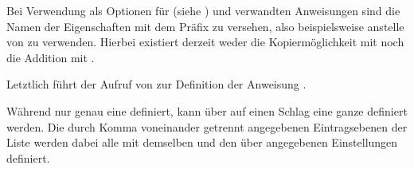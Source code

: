 Bei Verwendung als Optionen
für %
%
 (siehe
) und verwandten
Anweisungen sind die Namen der Eigenschaften mit dem Präfix  zu
versehen, also beispielsweise  anstelle von  zu
verwenden. Hierbei existiert derzeit weder die Kopiermöglichkeit mit
\Option{:=} noch die Addition mit \Option{+=}.

Letztlich führt der Aufruf von  zur Definition der
Anweisung .

Während  nur genau eine 
definiert, kann über
 auf einen
Schlag eine ganze  definiert werden. Die durch
Komma voneinander getrennt angegebenen Eintragsebenen der Liste werden dabei
alle mit demselben  und den über 
angegebenen Einstellungen definiert.%
%

